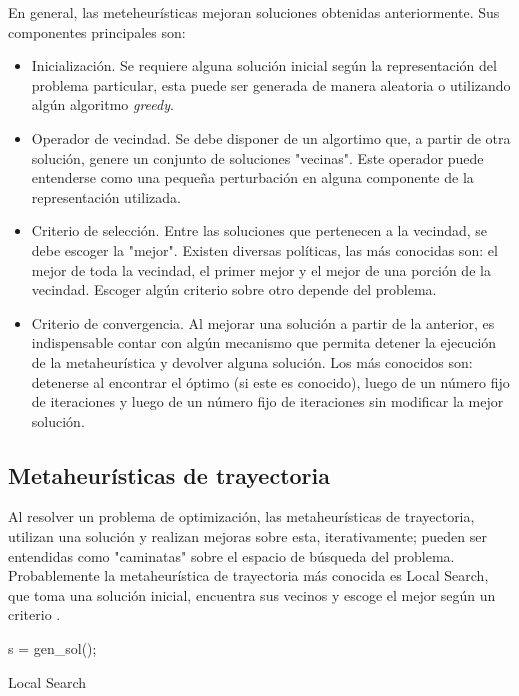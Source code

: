 \documentclass{ci5652}
\begin{document}
En general, las meteheurísticas mejoran soluciones obtenidas anteriormente. Sus
componentes principales son:

\begin{itemize}
  \item Inicialización. Se requiere alguna solución inicial según la
  representación del problema particular, esta puede ser generada de manera
  aleatoria o utilizando algún algoritmo \textit{greedy}.
  \item Operador de vecindad. Se debe disponer de un algortimo que, a partir de
  otra solución, genere un conjunto de soluciones "vecinas". Este operador puede
  entenderse como una pequeña perturbación en alguna componente de la
  representación utilizada.
  \item Criterio de selección. Entre las soluciones que pertenecen a la
  vecindad, se debe escoger la "mejor". Existen diversas políticas, las más
  conocidas son: el mejor de toda la vecindad, el primer mejor y el mejor de una
  porción de la vecindad. Escoger algún criterio sobre otro depende del
  problema.
  \item Criterio de convergencia. Al mejorar una solución a partir de la
  anterior, es indispensable contar con algún mecanismo que permita detener la
  ejecución de la metaheurística y devolver alguna solución. Los más conocidos
  son: detenerse al encontrar el óptimo (si este es conocido), luego de un
  número fijo de iteraciones y luego de un número fijo de iteraciones sin
  modificar la mejor solución.

\end{itemize}


\subsection{Metaheurísticas de trayectoria}

Al resolver un problema de optimización, las metaheurísticas de trayectoria,
utilizan una solución y realizan mejoras sobre esta, iterativamente; pueden ser
entendidas como "caminatas" sobre el espacio de búsqueda del problema.
Probablemente la metaheurística de trayectoria más conocida es
Local Search, que toma una solución inicial, encuentra sus vecinos y
escoge el mejor según un criterio \cite{Talbi_2009}.

\begin{algorithm}
 \DontPrintSemicolon
 \vspace*{0.1cm}
  s = gen\_sol();\;
 \vspace*{0.1cm}
 \caption{Local Search}
\end{algorithm}
\end{document}
